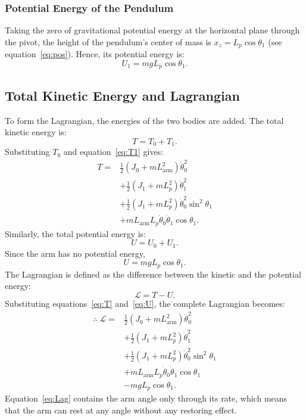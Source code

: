 \documentclass[a4paper,11pt]{article}
\newcommand{\La}{L_{\mathrm{arm}}}
\begin{document}
\subsubsection{Potential Energy of the Pendulum}
Taking the zero of gravitational potential energy at the horizontal plane through the pivot, the height of the pendulum's center of mass is $x_z = L_p \cos\theta_1$ (see equation~\ref{eq:pos}). Hence, its potential energy is:
\begin{equation}
  U_1 = m g L_p \cos\theta_1 .
\end{equation}

\subsection{Total Kinetic Energy and Lagrangian}
To form the Lagrangian, the energies of the two bodies are added. The total kinetic energy is:
\begin{equation}
  T = T_0 + T_1 .
\end{equation}
Substituting $T_0$ and equation~\ref{eq:T1} gives:
\begin{equation}
\begin{aligned}
  T = {}& \frac{1}{2}\left(J_0 + m \La^2\right)\dot\theta_0^2\\
  & + \frac{1}{2}\left(J_1 + m L_p^2\right)\dot\theta_1^2\\
  & + \frac{1}{2}\left(J_1 + m L_p^2\right)\dot\theta_0^2 \sin^2\theta_1\\
  & + m \La L_p \dot\theta_0 \dot\theta_1 \cos\theta_1 .
\end{aligned}
\label{eq:T}
\end{equation}
Similarly, the total potential energy is:
\begin{equation}
  U = U_0 + U_1 .
\end{equation}
Since the arm has no potential energy,
\begin{equation}
  U = m g L_p \cos\theta_1 .
  \label{eq:U}
\end{equation}
The Lagrangian is defined as the difference between the kinetic and the potential energy:
\begin{equation}
  \mathcal{L} = T - U .
\end{equation}
Substituting equations~\ref{eq:T} and~\ref{eq:U}, the complete Lagrangian becomes:
\begin{equation}
\begin{aligned}
  \therefore\; \mathcal{L} = {}& \frac{1}{2}\left(J_0 + m \La^2\right)\dot\theta_0^2\\
  & + \frac{1}{2}\left(J_1 + m L_p^2\right)\dot\theta_1^2\\
  & + \frac{1}{2}\left(J_1 + m L_p^2\right)\dot\theta_0^2 \sin^2\theta_1\\
  & + m \La L_p \dot\theta_0 \dot\theta_1 \cos\theta_1\\
  & - m g L_p \cos\theta_1 .
\end{aligned}
\label{eq:Lag}
\end{equation}
Equation~\ref{eq:Lag} contains the arm angle only through its rate, which means that the arm can rest at any angle without any restoring effect.
\end{document}
